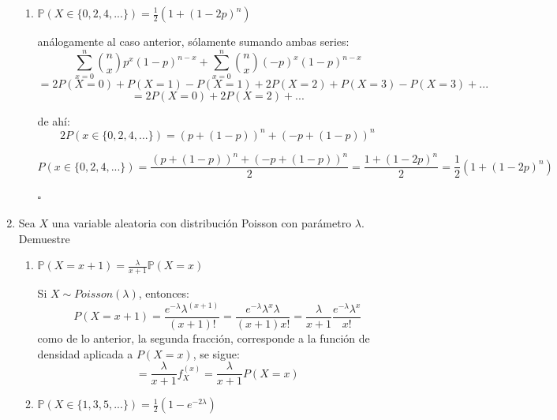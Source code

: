 \documentclass[11pt,a4paper]{report}
\begin{document}
\begin{enumerate}
{\begin{enumerate}
{					de ahí:
						$$ 2 P(x \in \{1,3,5,...\})
						   = (p + (1 - p))^n - (- p + (1 - p))^n $$

						$$ P(x \in \{1,3,5,...\})
						   = \frac{(p + (1 - p))^n - (- p + (1 - p))^n}{2}
						   = \frac{1 - (1 - 2p)^n}{2}
						   = \frac{1}{2}(1 - (1 - 2p)^n)$$
				}

				\item {
					$\mathbb{P}(X \in \{ 0,2,4,...\}) = \frac{1}{2}
					 (1 + (1 - 2p)^n)$

					análogamente al caso anterior, sólamente sumando ambas
					series:
						$$ \sum_{x = 0}^{n} {n \choose x}p^x(1 - p)^{n - x}
						 + \sum_{x = 0}^{n}{n \choose x}(-p)^x(1-p)^{n - x} $$
						$$ = 2 P(X = 0) + P(X = 1) - P(X = 1) +
							 2 P(X = 2) + P(X = 3) - P(X = 3) + ...$$
						$$ = 2 P(X = 0) + 2 P(X = 2) + ...$$

						de ahí:
						$$ 2 P(x \in \{0,2,4,...\})
						   = (p + (1 - p))^n + (- p + (1 - p))^n $$

						$$ P(x \in \{0,2,4,...\})
						   = \frac{(p + (1 - p))^n + (- p + (1 - p))^n}{2}
						   = \frac{1 + (1 - 2p)^n}{2}
						   = \frac{1}{2}(1 + (1 - 2p)^n)$$
														     \begin{flushright}
													 		  	$\square$
													 	  	  \end{flushright}
				}
			\end{enumerate}
		}

		\item{
		Sea $X$ una variable aleatoria con distribución Poisson con parámetro
		$\lambda$. Demuestre
			\begin{enumerate}
				\item {
					$\mathbb{P}(X = x + 1) = \frac{\lambda}{x + 1}
					 \mathbb{P}(X = x)$

					Si $X \sim Poisson(\lambda)$, entonces:
						$$ P(X = x + 1) = \frac{e^{-\lambda} \lambda^{(x + 1)}}
										  {(x + 1)!}
						 = \frac{e^{-\lambda} \lambda^x \lambda} {(x + 1) x!}
						 = \frac{\lambda}{x + 1}
						   \frac{e^{-\lambda} \lambda^x}{x!}$$
					como de lo anterior, la segunda fracción, corresponde a
					la función de densidad aplicada a $P(X = x)$, se sigue:
						$$ = \frac{\lambda}{x + 1} f_X^{(x)}
						   = \frac{\lambda}{x + 1} P(X = x)$$
				}

				\item {
					$\mathbb{P}(X \in \{ 1,3,5,...\}) = \frac{1}{2}
					 (1 - e^{-2\lambda})$

}
\end{enumerate}}
\end{enumerate}
\end{document}
